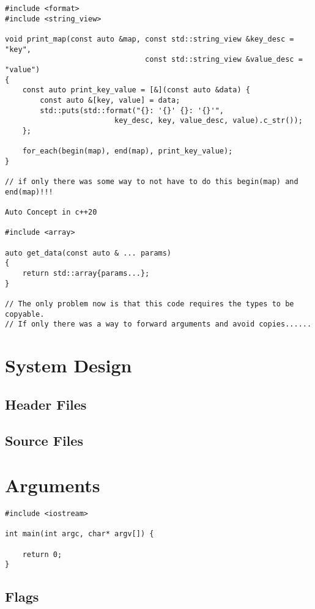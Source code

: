 \documentclass[openany]{report}
\begin{document}
\begin{verbatim}
#include <format>
#include <string_view>

void print_map(const auto &map, const std::string_view &key_desc = "key",
                                const std::string_view &value_desc = "value")
{
    const auto print_key_value = [&](const auto &data) { 
        const auto &[key, value] = data;
        std::puts(std::format("{}: '{}' {}: '{}'",
                         key_desc, key, value_desc, value).c_str());
    };

    for_each(begin(map), end(map), print_key_value);
}

// if only there was some way to not have to do this begin(map) and end(map)!!!

Auto Concept in c++20

#include <array>

auto get_data(const auto & ... params)
{
    return std::array{params...};
}

// The only problem now is that this code requires the types to be copyable.
// If only there was a way to forward arguments and avoid copies......
\end{verbatim}

\section{System Design}

\subsection{Header Files}

\subsection{Source Files}

\section{Arguments}

\begin{verbatim}
#include <iostream>

int main(int argc, char* argv[]) {

    return 0;
}
\end{verbatim}

\subsection{Flags}
\end{document}
